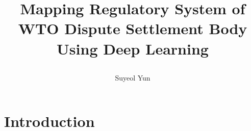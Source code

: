 \documentclass[12pt,letterpaper]{article}
\newcommand{\tit}{
\bf 
Mapping Regulatory System of WTO Dispute Settlement Body Using Deep Learning
}
\newcommand\spacingset[1]{\renewcommand{\baselinestretch}
{#1}\small\normalsize}
\begin{document}
\spacingset{1.25}

\setcounter{page}{0}
\vspace{-.1in}

{\title{
    \tit
  }
  \author{Suyeol Yun
  }
  \maketitle
}

\thispagestyle{empty}
\vspace{-.1in}

\begin{abstract}
\end{abstract}

\spacingset{1.5} %

% 


\section{Introduction}











% 


% 

% 
\end{document}
